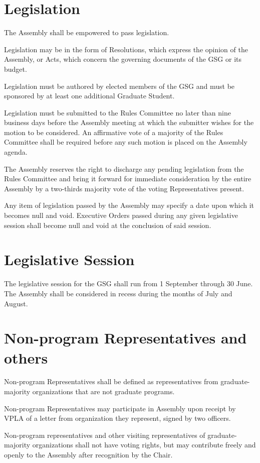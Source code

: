 \section{Legislation}
\begin{bylaws-number}
  \item The Assembly shall be empowered to pass legislation.
  \item Legislation may be in the form of Resolutions, which express the opinion of the Assembly, or Acts, which concern the governing documents of the GSG or its budget.
  \item Legislation must be authored by elected members of the GSG and must be sponsored by at least one additional Graduate Student.
  \item Legislation must be submitted to the Rules Committee no later than nine business days before the Assembly meeting at which the submitter wishes for the motion to be considered. An affirmative vote of a majority of the Rules Committee shall be required before any such motion is placed on the Assembly agenda.
  \item The Assembly reserves the right to discharge any pending legislation from the Rules Committee and bring it forward for immediate consideration by the entire Assembly by a two-thirds majority vote of the voting Representatives present.
  \item Any item of legislation passed by the Assembly may specify a date upon which it becomes null and void. Executive Orders passed during any given legislative session shall become null and void at the conclusion of said session.
\end{bylaws-number}

\section{Legislative Session}
\begin{bylaws-number}
  \item The legislative session for the GSG shall run from 1 September through 30 June. The Assembly shall be considered in recess during the months of July and August.
\end{bylaws-number}

\section{Non-program Representatives and others}
\begin{bylaws-number}
  \item Non-program Representatives shall be defined as representatives from graduate-majority organizations that are not graduate programs.
  \item Non-program Representatives may participate in Assembly upon receipt by VPLA of a letter from organization they represent, signed by two officers.
  \item Non-program representatives and other visiting representatives of graduate-majority organizations shall not have voting rights, but may contribute freely and openly to the Assembly after recognition by the Chair.
\end{bylaws-number}

